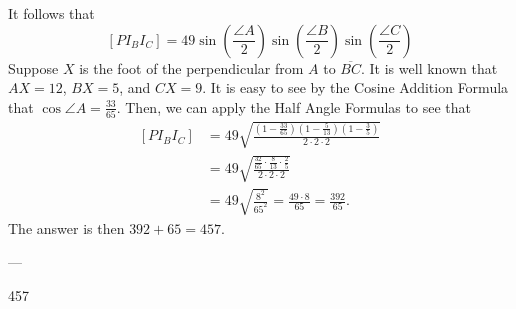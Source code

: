 It follows that \[\left[PI_BI_C\right]=49\sin\left(\frac{\angle A}{2}\right)\sin\left(\frac{\angle B}{2}\right)\sin\left(\frac{\angle C}{2}\right)\]
Suppose $X$ is the foot of the perpendicular from $A$ to $\overline{BC}$. It is well known that $AX=12$, $BX=5$, and $CX=9$. It is easy to see by the Cosine Addition Formula that $\cos\angle A=\frac{33}{65}$. Then, we can apply the Half Angle Formulas to see that
\begin{align*}
    \left[PI_BI_C\right]&=49\sqrt{\frac{\left(1-\frac{33}{65}\right)\left(1-\frac{5}{13}\right)\left(1-\frac{3}{5}\right)}{2\cdot 2\cdot 2}}\\
    &=49\sqrt{\frac{\frac{32}{65}\cdot\frac{8}{13}\cdot\frac{2}{5}}{2\cdot 2\cdot 2}}\\
    &=49\sqrt{\frac{8^2}{65^2}}=\frac{49\cdot 8}{65}=\frac{392}{65}.
\end{align*}
The answer is then $392+65=457$.

---

457
